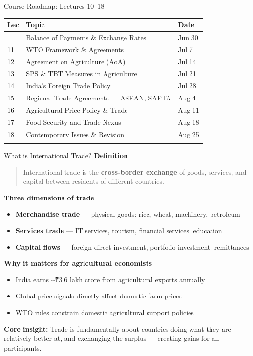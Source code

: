 \documentclass[
  ignorenonframetext,
  aspectratio=169,
]{beamer}
\makeatletter
\providecommand{\tightlist}{%
  \setlength{\itemsep}{0pt}\setlength{\parskip}{0pt}}
\let\quarto@originallabel\label
\DeclareRobustCommand*{\label}[1]{\quarto@originallabel{#1}}
\makeatother
\begin{document}
\begin{frame}{Course Roadmap: Lectures 10--18}
\label{course-roadmap-lectures-1018}
\begin{longtable}[]{@{}lll@{}}
\toprule\noalign{}
Lec & Topic & Date \\
\midrule\noalign{}
\endhead
10 & Balance of Payments \& Exchange Rates & Jun 30 \\
11 & WTO Framework \& Agreements & Jul 7 \\
12 & Agreement on Agriculture (AoA) & Jul 14 \\
13 & SPS \& TBT Measures in Agriculture & Jul 21 \\
14 & India's Foreign Trade Policy & Jul 28 \\
15 & Regional Trade Agreements --- ASEAN, SAFTA & Aug 4 \\
16 & Agricultural Price Policy \& Trade & Aug 11 \\
17 & Food Security and Trade Nexus & Aug 18 \\
18 & Contemporary Issues \& Revision & Aug 25 \\
\bottomrule\noalign{}
\end{longtable}
\end{frame}

\begin{frame}{What is International Trade?}
\label{what-is-international-trade}
\textbf{Definition}

\begin{quote}
International trade is the \textbf{cross-border exchange} of goods,
services, and capital between residents of different countries.
\end{quote}

\textbf{Three dimensions of trade}

\begin{itemize}
\tightlist
\item
  \textbf{Merchandise trade} --- physical goods: rice, wheat, machinery,
  petroleum
\item
  \textbf{Services trade} --- IT services, tourism, financial services,
  education
\item
  \textbf{Capital flows} --- foreign direct investment, portfolio
  investment, remittances
\end{itemize}

\textbf{Why it matters for agricultural economists}

\begin{itemize}
\tightlist
\item
  India earns \textasciitilde₹3.6 lakh crore from agricultural exports
  annually
\item
  Global price signals directly affect domestic farm prices
\item
  WTO rules constrain domestic agricultural support policies
\end{itemize}

\textbf{Core insight:} Trade is fundamentally about countries doing what
they are relatively better at, and exchanging the surplus --- creating
gains for all participants.
\end{frame}
\end{document}
